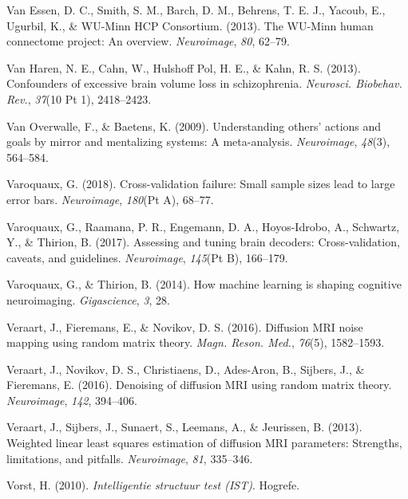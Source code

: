 \documentclass[12pt,american,a4paper,oneside,]{memoir} %
\begin{document}
\leavevmode\hypertarget{ref-Van_Essen2013-df}{}%
Van Essen, D. C., Smith, S. M., Barch, D. M., Behrens, T. E. J., Yacoub, E., Ugurbil, K., \& WU-Minn HCP Consortium. (2013). The WU-Minn human connectome project: An overview. \emph{Neuroimage}, \emph{80}, 62--79.

\leavevmode\hypertarget{ref-Van_Haren2013-iv}{}%
Van Haren, N. E., Cahn, W., Hulshoff Pol, H. E., \& Kahn, R. S. (2013). Confounders of excessive brain volume loss in schizophrenia. \emph{Neurosci. Biobehav. Rev.}, \emph{37}(10 Pt 1), 2418--2423.

\leavevmode\hypertarget{ref-van2009understanding}{}%
Van Overwalle, F., \& Baetens, K. (2009). Understanding others' actions and goals by mirror and mentalizing systems: A meta-analysis. \emph{Neuroimage}, \emph{48}(3), 564--584.

\leavevmode\hypertarget{ref-Varoquaux2018-uo}{}%
Varoquaux, G. (2018). Cross-validation failure: Small sample sizes lead to large error bars. \emph{Neuroimage}, \emph{180}(Pt A), 68--77.

\leavevmode\hypertarget{ref-Varoquaux2017-fj}{}%
Varoquaux, G., Raamana, P. R., Engemann, D. A., Hoyos-Idrobo, A., Schwartz, Y., \& Thirion, B. (2017). Assessing and tuning brain decoders: Cross-validation, caveats, and guidelines. \emph{Neuroimage}, \emph{145}(Pt B), 166--179.

\leavevmode\hypertarget{ref-Varoquaux2014-su}{}%
Varoquaux, G., \& Thirion, B. (2014). How machine learning is shaping cognitive neuroimaging. \emph{Gigascience}, \emph{3}, 28.

\leavevmode\hypertarget{ref-Veraart2016-zi}{}%
Veraart, J., Fieremans, E., \& Novikov, D. S. (2016). Diffusion MRI noise mapping using random matrix theory. \emph{Magn. Reson. Med.}, \emph{76}(5), 1582--1593.

\leavevmode\hypertarget{ref-Veraart2016-rv}{}%
Veraart, J., Novikov, D. S., Christiaens, D., Ades-Aron, B., Sijbers, J., \& Fieremans, E. (2016). Denoising of diffusion MRI using random matrix theory. \emph{Neuroimage}, \emph{142}, 394--406.

\leavevmode\hypertarget{ref-Veraart2013-ya}{}%
Veraart, J., Sijbers, J., Sunaert, S., Leemans, A., \& Jeurissen, B. (2013). Weighted linear least squares estimation of diffusion MRI parameters: Strengths, limitations, and pitfalls. \emph{Neuroimage}, \emph{81}, 335--346.

\leavevmode\hypertarget{ref-Vorst2010-ex}{}%
Vorst, H. (2010). \emph{Intelligentie structuur test (IST)}. Hogrefe.
\end{document}
